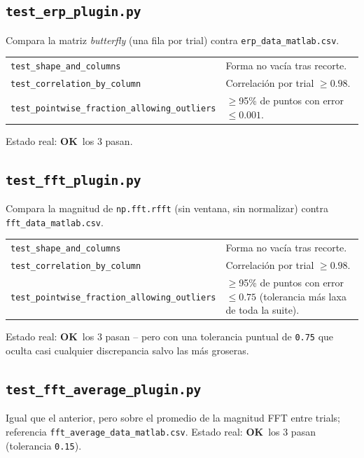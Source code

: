 \documentclass[11pt,a4paper]{article}
\newcommand{\okmark}{\textcolor{ok}{\textbf{OK}}}
\begin{document}
\subsection{\texttt{test\_\allowbreak erp\_\allowbreak plugin.py}}
Compara la matriz \textit{butterfly} (una fila por trial) contra \texttt{erp\_\allowbreak data\_\allowbreak matlab.csv}.
\begin{center}
\begin{tabular}{ll}
\toprule
\texttt{test\_\allowbreak shape\_\allowbreak and\_\allowbreak columns} & Forma no vacía tras recorte. \\
\texttt{test\_\allowbreak correlation\_\allowbreak by\_\allowbreak column} & Correlación por trial $\geq 0.98$. \\
\texttt{test\_\allowbreak pointwise\_\allowbreak fraction\_\allowbreak allowing\_\allowbreak outliers} & $\geq$95\% de puntos con error $\leq 0.001$. \\
\bottomrule
\end{tabular}
\end{center}
Estado real: \okmark\ los 3 pasan.

\subsection{\texttt{test\_\allowbreak fft\_\allowbreak plugin.py}}
Compara la magnitud de \texttt{np.fft.rfft} (sin ventana, sin normalizar) contra \texttt{fft\_\allowbreak data\_\allowbreak matlab.csv}.
\begin{center}
\begin{tabular}{ll}
\toprule
\texttt{test\_\allowbreak shape\_\allowbreak and\_\allowbreak columns} & Forma no vacía tras recorte. \\
\texttt{test\_\allowbreak correlation\_\allowbreak by\_\allowbreak column} & Correlación por trial $\geq 0.98$. \\
\texttt{test\_\allowbreak pointwise\_\allowbreak fraction\_\allowbreak allowing\_\allowbreak outliers} & $\geq$95\% de puntos con error $\leq 0.75$ (tolerancia más laxa de toda la suite). \\
\bottomrule
\end{tabular}
\end{center}
Estado real: \okmark\ los 3 pasan -- pero con una tolerancia puntual de \texttt{0.75} que oculta casi
cualquier discrepancia salvo las más groseras.

\subsection{\texttt{test\_\allowbreak fft\_\allowbreak average\_\allowbreak plugin.py}}
Igual que el anterior, pero sobre el promedio de la magnitud FFT entre trials; referencia
\texttt{fft\_\allowbreak average\_\allowbreak data\_\allowbreak matlab.csv}. Estado real: \okmark\ los 3 pasan (tolerancia \texttt{0.15}).
\end{document}
